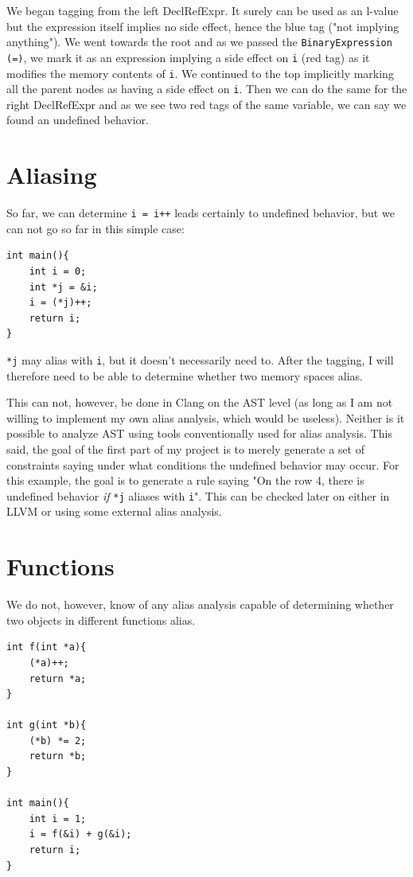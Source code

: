 We began tagging from the left DeclRefExpr. It surely can be used as an l-value but the expression itself implies no side effect, hence the blue tag ("not implying anything"). We went towards the root and as we passed the \verb|BinaryExpression (=)|, we mark it as an expression implying a side effect on \verb|i| (red tag) as it modifies the memory contents of \verb|i|. We continued to the top implicitly marking all the parent nodes as having a side effect on \verb|i|. Then we can do the same for the right DeclRefExpr and as we see two red tags of the same variable, we can say we found an undefined behavior.

\section{Aliasing}
So far, we can determine \verb|i = i++| leads certainly to undefined behavior, but we can not go so far in this simple case:

\begin{lstlisting}
int main(){
	int i = 0;
	int *j = &i;
	i = (*j)++;
    return i;
}
\end{lstlisting}

\verb|*j| may alias with \verb|i|, but it doesn't necessarily need to. After the tagging, I will therefore need to be able to determine whether two memory spaces alias.

This can not, however, be done in Clang on the AST level (as long as I am not willing to implement my own alias analysis, which would be useless). Neither is it possible to analyze AST using tools conventionally used for alias analysis. This said, the goal of the first part of my project is to merely generate a set of constraints saying under what conditions the undefined behavior may occur. For this example, the goal is to generate a rule saying "On the row 4, there is undefined behavior \emph{if} \verb|*j| aliases with \verb|i|". This can be checked later on either in LLVM or using some external alias analysis.

\section{Functions}
We do not, however, know of any alias analysis capable of determining whether two objects in different functions alias.

\begin{lstlisting}
int f(int *a){
    (*a)++;
    return *a;
}

int g(int *b){
    (*b) *= 2;
    return *b;
}

int main(){
    int i = 1;
    i = f(&i) + g(&i);
    return i;
}
\end{lstlisting}

